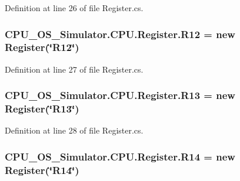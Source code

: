 Definition at line 26 of file Register.\+cs.

\hypertarget{class_c_p_u___o_s___simulator_1_1_c_p_u_1_1_register_abb2b38dad72e0b3e97fcf7e09a0bf1f9}{}
\subsubsection[{R12}]{ C\+P\+U\+\_\+\+O\+S\+\_\+\+Simulator.\+C\+P\+U.\+Register.\+R12 = new {\bf Register}(\char`\"{}R12\char`\"{})\hspace{0.3cm}{\ttfamily [static]}}\label{class_c_p_u___o_s___simulator_1_1_c_p_u_1_1_register_abb2b38dad72e0b3e97fcf7e09a0bf1f9}


Definition at line 27 of file Register.\+cs.

\hypertarget{class_c_p_u___o_s___simulator_1_1_c_p_u_1_1_register_adb4ed15863b50ae94a10416d9fc35a34}{}
\subsubsection[{R13}]{ C\+P\+U\+\_\+\+O\+S\+\_\+\+Simulator.\+C\+P\+U.\+Register.\+R13 = new {\bf Register}(\char`\"{}R13\char`\"{})\hspace{0.3cm}{\ttfamily [static]}}\label{class_c_p_u___o_s___simulator_1_1_c_p_u_1_1_register_adb4ed15863b50ae94a10416d9fc35a34}


Definition at line 28 of file Register.\+cs.

\hypertarget{class_c_p_u___o_s___simulator_1_1_c_p_u_1_1_register_ad2c93dc9788349569aac3a5ba60f7581}{}
\subsubsection[{R14}]{ C\+P\+U\+\_\+\+O\+S\+\_\+\+Simulator.\+C\+P\+U.\+Register.\+R14 = new {\bf Register}(\char`\"{}R14\char`\"{})\hspace{0.3cm}{\ttfamily [static]}}\label{class_c_p_u___o_s___simulator_1_1_c_p_u_1_1_register_ad2c93dc9788349569aac3a5ba60f7581}


